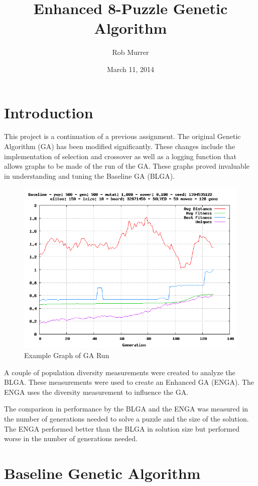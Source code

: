 \documentclass[]{article}
\title{Enhanced 8-Puzzle Genetic Algorithm}
\author{Rob Murrer}
\date{March 11, 2014}
\begin{document}
\maketitle

\section{Introduction}\label{introduction}

This project is a continuation of a previous assignment. The original
Genetic Algorithm (GA) has been modified significantly. These changes
include the implementation of selection and crossover as well as a
logging function that allows graphs to be made of the run of the GA.
These graphs proved invaluable in understanding and tuning the Baseline
GA (BLGA).

\begin{figure}[htbp]
\centering
\includegraphics{img/intro-graph.png}
\caption{Example Graph of GA Run}
\end{figure}

A couple of population diversity measurements were created to analyze
the BLGA. These measurements were used to create an Enhanced GA (ENGA).
The ENGA uses the diversity measurement to influence the GA.

The comparison in performance by the BLGA and the ENGA was measured in
the number of generations needed to solve a puzzle and the size of the
solution. The ENGA performed better than the BLGA in solution size but
performed worse in the number of generations needed.

\section{Baseline Genetic Algorithm}\label{baseline-genetic-algorithm}
\end{document}
